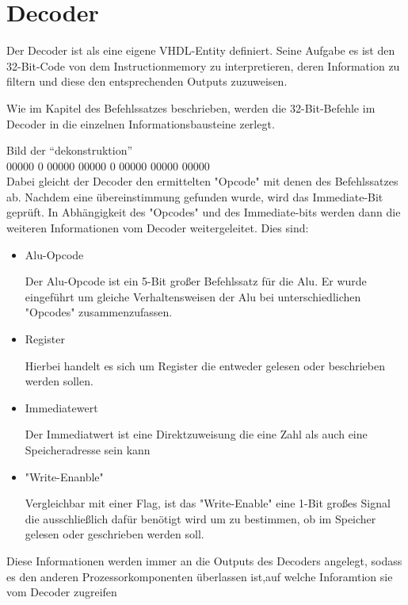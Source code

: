 \documentclass[paper=a4,fontsize=12pt,twocolumn]{scrreprt}
\begin{document}

\section{Decoder}


Der Decoder ist als eine eigene VHDL-Entity definiert. Seine Aufgabe es ist den 32-Bit-Code von dem Instructionmemory zu interpretieren, deren Information zu filtern und diese den entsprechenden Outputs zuzuweisen.
 {\color{red}
Wie im Kapitel des Befehlssatzes beschrieben, werden die 32-Bit-Befehle im Decoder in die einzelnen Informationsbausteine zerlegt.

Bild der \enquote{dekonstruktion}
\\
 00000  0  00000  00000   0 00000 00000 00000
\\

Dabei gleicht der Decoder den ermittelten "Opcode" mit denen des Befehlssatzes ab. Nachdem eine übereinstimmung gefunden wurde, wird das Immediate-Bit geprüft. In Abhängigkeit des "Opcodes" und des Immediate-bits werden dann die weiteren Informationen vom Decoder weitergeleitet. 
Dies sind:

\begin{itemize}
 \item Alu-Opcode

 Der Alu-Opcode ist ein 5-Bit großer Befehlssatz für die Alu. Er wurde eingeführt um gleiche Verhaltensweisen der Alu bei unterschiedlichen "Opcodes" zusammenzufassen.

\item Register

 Hierbei handelt es sich um Register die entweder gelesen oder beschrieben werden sollen. 

\item Immediatewert

 Der Immediatwert ist eine Direktzuweisung die eine Zahl als auch eine Speicheradresse sein kann

\item "Write-Enanble"

 Vergleichbar mit einer Flag, ist das "Write-Enable" eine 1-Bit großes Signal die ausschließlich dafür benötigt wird um zu bestimmen, ob im Speicher gelesen oder geschrieben werden soll.
\end{itemize}

 Diese Informationen werden immer an die Outputs des Decoders angelegt, sodass es den anderen Prozessorkomponenten überlassen ist,auf welche Inforamtion sie vom Decoder zugreifen}
\end{document}
